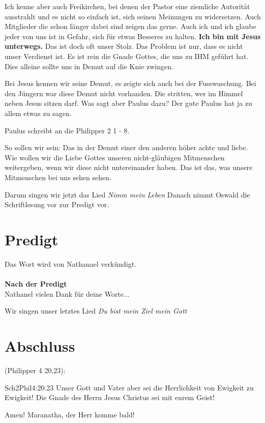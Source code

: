 \documentclass[12pt,a4paper]{scrarticle}
\begin{document}
Ich kenne aber auch Freikirchen, bei denen der Pastor eine ziemliche Autorität ausstrahlt und es nicht so einfach ist, sich seinen Meinungen zu widersetzen. Auch Mitglieder die schon länger \glqq dabei sind\grqq{} zeigen das gerne. Auch ich und ich glaube jeder von uns ist in Gefahr, sich für etwas Besseres zu halten. \textbf{Ich bin mit Jesus unterwegs.} Das ist doch oft unser Stolz. Das Problem ist nur, dass es nicht unser Verdienst ist. Es ist rein die Gnade Gottes, die uns zu IHM geführt hat. Dies alleine sollte uns in Demut auf die Knie zwingen.

Bei Jesus kennen wir seine Demut, es zeigte sich auch bei der Fusswaschung. Bei den Jüngern war diese Demut nicht vorhanden. Die stritten, wer im Himmel neben Jesus sitzen darf. Was sagt aber Paulus dazu? Der gute Paulus hat ja zu allem etwas zu sagen.

Paulus schreibt an die Philipper 2 1 - 8.

So sollen wir sein: Das in der Demut einer den anderen höher achte und liebe. Wie wollen wir die Liebe Gottes unseren nicht-gläubigen Mitmenschen weitergeben, wenn wir diese nicht untereinander haben. Das ist das, was unsere Mitmenschen bei uns sehen sehen.

Darum singen wir jetzt das Lied \textit{Nimm mein Leben}
Danach nimmt Oswald die Schriftlesung vor zur Predigt vor.

\section{Predigt}
Das Wort wird von Nathanael verkündigt.
\\
\\
\textbf{Nach der Predigt}\\
Nathanel vielen Dank für deine Worte...

Wir singen unser letztes Lied \textit{Du bist mein Ziel mein Gott}

\section{Abschluss}
(Philipper 4 20.23):
\begin{bibeltext}{Sch2}{Phil}{4:20.23}
Unser Gott und Vater aber sei die Herrlichkeit von Ewigkeit zu Ewigkeit!
Die Gnade des Herrn Jesus Christus sei mit eurem Geist!
\end{bibeltext}
Amen! Maranatha, der Herr komme bald!
\end{document}

